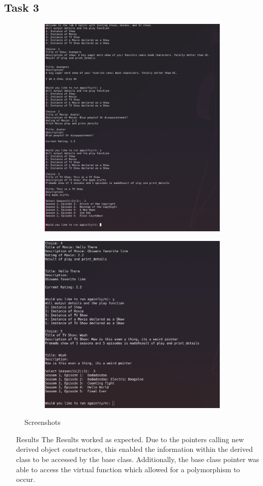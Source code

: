 \documentclass[10pt]{article}
\begin{document}
	\subsection{Task 3}
	\begin{figure}
		\centering
		\begin{subfigure}{.8\textwidth}
			\centering
			\includegraphics[width=0.7\linewidth]{Screenshot41}
		\end{subfigure}
		\begin{subfigure}{.8\textwidth}
			\centering
			\includegraphics[width=0.7\linewidth]{Screenshot42}
		\end{subfigure}
	\caption{Screenshots}
	\end{figure}
	\begin{itemize}
		\item [Results]
		The Results worked as expected. Due to the pointers calling new derived object constructors, this enabled the information within the derived class to be accessed by the base class. Additionally, the base class pointer was able to access the virtual function which allowed for a polymorphism to occur.
	\end{itemize}
\end{document}
